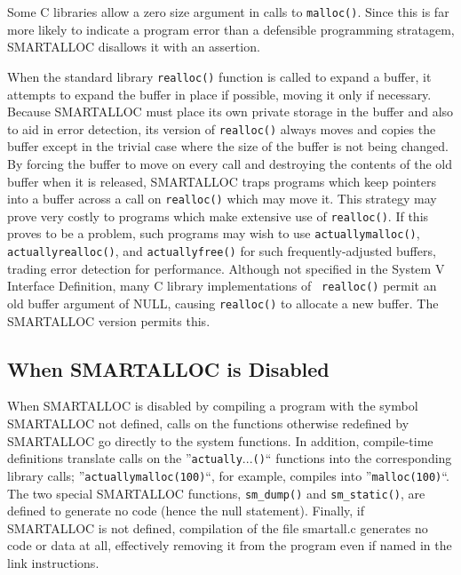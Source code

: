 Some C libraries allow a zero size argument in calls to {\tt malloc()}. Since
this is far more likely to indicate a program error than a defensible
programming stratagem, SMARTALLOC disallows it with an assertion. 

When the standard library {\tt realloc()} function is called to expand a
buffer, it attempts to expand the buffer in place if possible, moving it only
if necessary. Because SMARTALLOC must place its own private storage in the
buffer and also to aid in error detection, its version of {\tt realloc()}
always moves and copies the buffer except in the trivial case where the size
of the buffer is not being changed. By forcing the buffer to move on every
call and destroying the contents of the old buffer when it is released,
SMARTALLOC traps programs which keep pointers into a buffer across a call on
{\tt realloc()} which may move it. This strategy may prove very costly to
programs which make extensive use of {\tt realloc()}. If this proves to be a
problem, such programs may wish to use {\tt actuallymalloc()}, {\tt
actuallyrealloc()}, and {\tt actuallyfree()} for such frequently-adjusted
buffers, trading error detection for performance. Although not specified in
the System V Interface Definition, many C library implementations of {\tt
realloc()} permit an old buffer argument of NULL, causing {\tt realloc()} to
allocate a new buffer. The SMARTALLOC version permits this. 

\subsection{ When SMARTALLOC is Disabled}

When SMARTALLOC is disabled by compiling a program with the symbol SMARTALLOC
not defined, calls on the functions otherwise redefined by SMARTALLOC go
directly to the system functions. In addition, compile-time definitions
translate calls on the ''{\tt actually}...{\tt ()}`` functions into the
corresponding library calls; ''{\tt actuallymalloc(100)}``, for example,
compiles into ''{\tt malloc(100)}``. The two special SMARTALLOC functions,
{\tt sm\_dump()} and {\tt sm\_static()}, are defined to generate no code
(hence the null statement). Finally, if SMARTALLOC is not defined, compilation
of the file smartall.c generates no code or data at all, effectively removing
it from the program even if named in the link instructions. 

